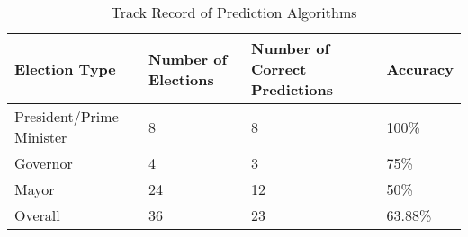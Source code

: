 \begin{table*}
        \centering
        \begin{tabular}{| l | l | l | l |}
        \hline
        Election Type & Number of Elections & Number of Correct Predictions & Accuracy\\
        \hline
        President/Prime Minister & 8 & 8 & 100\%\\
        Governor & 4 & 3 & 75\%\\
        Mayor & 24 & 12 & 50\%\\
        Overall & 36 & 23 & 63.88\%\\
        \hline
        \end{tabular}
        \vspace{-0.5em}
        \caption{Track Record of Prediction Algorithms}
        \label{table:trackRecord}
        \vspace{-0.5em}
\end{table*}